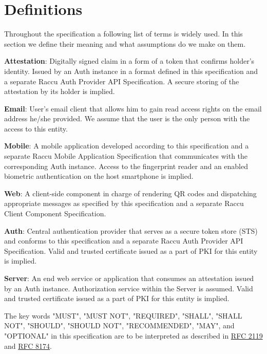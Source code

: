 \section{Definitions}
Throughout the specification a following list of terms is widely used. In this section we define their meaning 
and what assumptions do we make on them.

\medskip
\textbf{Attestation}: Digitally signed claim in a form of a token that confirms holder's identity. Issued by 
an Auth instance in a format defined in this specification and a separate Raccu Auth Provider API Specification. 
A secure storing of the attestation by its holder is implied.

\medskip
\textbf{Email}: User's email client that allows him to gain read access rights on the email address he/she 
provided. We assume that the user is the only person with the access to this entity.

\medskip
\textbf{Mobile}: A mobile application developed according to this specification and a separate Raccu Mobile 
Application Specification that communicates with the corresponding Auth instance. Access to the fingerprint 
reader and an enabled biometric authentication on the host smartphone is implied.

\medskip
\textbf{Web}: A client-side component in charge of rendering QR codes and dispatching appropriate messages 
as specified by this specification and a separate Raccu Client Component Specification.

\medskip
\textbf{Auth}: Central authentication provider that serves as a secure token store (STS) and conforms to 
this specification and a separate Raccu Auth Provider API Specification. Valid and trusted certificate 
issued as a part of PKI for this entity is implied.

\medskip
\textbf{Server}: An end web service or application that consumes an attestation issued by an Auth instance. 
Authorization service within the Server is assumed. Valid and trusted certificate issued as a part of PKI 
for this entity is implied.

\medskip
The key words "MUST", "MUST NOT", "REQUIRED", "SHALL", "SHALL NOT", "SHOULD", "SHOULD NOT", "RECOMMENDED", 
"MAY", and "OPTIONAL" in this specification are to be interpreted as described in 
\href{https://tools.ietf.org/html/rfc2119}{RFC 2119} and \href{https://tools.ietf.org/html/rfc8174}{RFC 8174}.